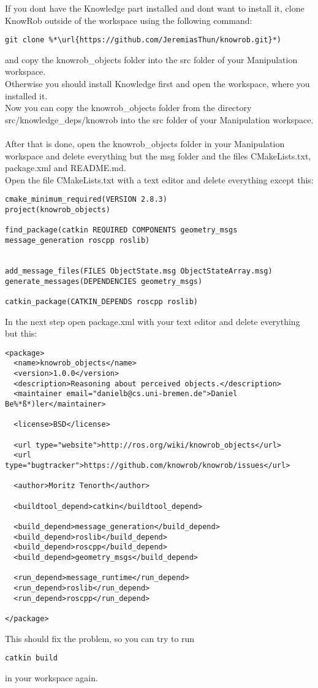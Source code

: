 \documentclass[main.tex]{subfiles}
\begin{document}
If you dont have the Knowledge part installed and dont want to install it, clone KnowRob outside of the workspace using the following command:\\
\begin{lstlisting}
git clone %*\url{https://github.com/JeremiasThun/knowrob.git}*)
\end{lstlisting}
and copy the knowrob\_objects folder into the src folder of your Manipulation workspace.\\
Otherwise you should install Knowledge first and open the workspace, where you installed it.\\
Now you can copy the knowrob\_objects folder from the directory \\
src/knowledge\_deps/knowrob into the src folder of your Manipulation workspace.\\
\\
 After that is done, open the knowrob\_objects folder in your Manipulation workspace and delete everything but the msg folder and the files CMakeLists.txt, package.xml and README.md.\\
Open the file CMakeLists.txt with a text editor and delete everything except this:\\
\begin{lstlisting}
cmake_minimum_required(VERSION 2.8.3)
project(knowrob_objects)

find_package(catkin REQUIRED COMPONENTS geometry_msgs message_generation roscpp roslib)


add_message_files(FILES ObjectState.msg ObjectStateArray.msg)
generate_messages(DEPENDENCIES geometry_msgs)

catkin_package(CATKIN_DEPENDS roscpp roslib)
\end{lstlisting}
In the next step open package.xml with your text editor and delete everything but this:\\
\begin{lstlisting}
<package>
  <name>knowrob_objects</name>
  <version>1.0.0</version>
  <description>Reasoning about perceived objects.</description>
  <maintainer email="danielb@cs.uni-bremen.de">Daniel Be%*ß*)ler</maintainer>

  <license>BSD</license>

  <url type="website">http://ros.org/wiki/knowrob_objects</url>
  <url type="bugtracker">https://github.com/knowrob/knowrob/issues</url>

  <author>Moritz Tenorth</author>

  <buildtool_depend>catkin</buildtool_depend>

  <build_depend>message_generation</build_depend>
  <build_depend>roslib</build_depend>
  <build_depend>roscpp</build_depend>
  <build_depend>geometry_msgs</build_depend>
  
  <run_depend>message_runtime</run_depend>
  <run_depend>roslib</run_depend>
  <run_depend>roscpp</run_depend>

</package>
\end{lstlisting}
This should fix the problem, so you can try to run
\begin{lstlisting}
catkin build
\end{lstlisting}
in your workspace again.
\end{document}
